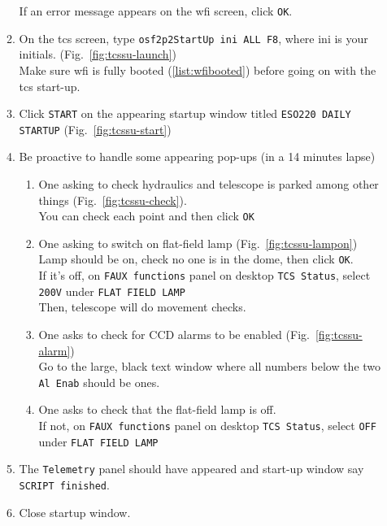 \documentclass[11pt,fleqn]{book} %
\begin{document}
\begin{enumerate}
\begin{enumerate}
                If an error message appears on the \gls{wfi} screen, click \texttt{OK}. 
          \item On the \gls{tcs} screen, type \texttt{osf2p2StartUp ini ALL F8}, where ini is your initials.\label{list:tcsboot} (Fig.~\ref{fig:tcssu-launch})\\
           Make sure \gls{wfi} is fully booted (\ref{list:wfibooted}) before going on with the \gls{tcs} start-up.
          \item Click \texttt{START} on the appearing startup window titled \texttt{ESO220 DAILY STARTUP} (Fig.~\ref{fig:tcssu-start})
          \item Be proactive to handle some appearing pop-ups (in a 14 minutes lapse) 
          \begin{enumerate}
             \item One asking to check hydraulics and telescope is parked among other things (Fig.~\ref{fig:tcssu-check}).\\
                   You can check each point and then click \texttt{OK}          
             \item One asking to switch on flat-field lamp\label{list:tcsonline} (Fig.~\ref{fig:tcssu-lampon})\\
                   Lamp should be on, check no one is in the dome, then click \texttt{OK}.\\
                   If it's off,  on \texttt{FAUX functions} panel on desktop \texttt{TCS Status}, select \texttt{200V} under \texttt{FLAT FIELD LAMP}\\
                   Then, telescope will do movement checks.
             \item One asks to check for CCD alarms to be enabled (Fig.~\ref{fig:tcssu-alarm})\\
                   Go to the large, black text window where all numbers below the two \texttt{Al Enab} should be ones.
             \item One asks to check that the flat-field lamp is off.\\
                   If not, on \texttt{FAUX functions} panel on desktop \texttt{TCS Status}, select \texttt{OFF} under \texttt{FLAT FIELD LAMP}          
          \end{enumerate}
          \item The \texttt{Telemetry} panel should have appeared and start-up window say \texttt{SCRIPT finished}.
             \label{list:tcsbooted}
          \item Close startup window.

\end{enumerate}
\end{enumerate}
\end{document}
